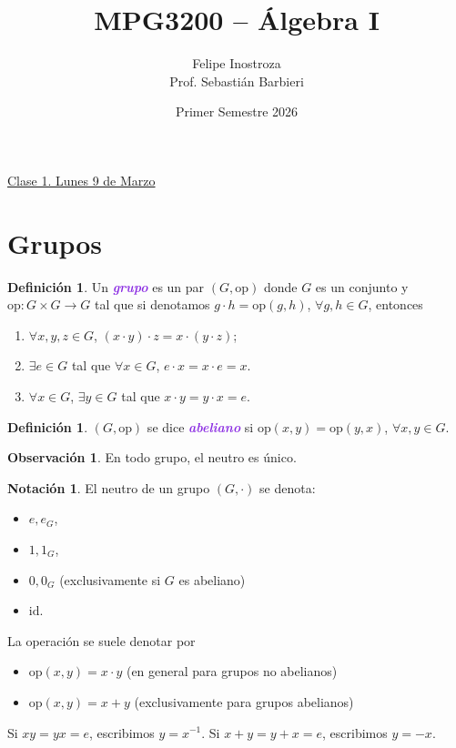 \documentclass{article}
\title{MPG3200 -- Álgebra I}
\author{Felipe Inostroza \\ Prof. Sebastián Barbieri}
\date{Primer Semestre 2026}
\theoremstyle{definition}
\newtheorem{definition}[theorem]{Definición}
\newtheorem*{notation}{Notación}
\newtheorem*{obs}{Observación}
\theoremstyle{remark}
\numberwithin{equation}{section}
\newcommand{\id}{\mathrm{id}}
\newcommand{\op}{\mathrm{op}}
\newcommand{\wea}[1]{\textcolor{BlueViolet}{\textbf{\emph{#1}}}}
\newcommand{\fecha}[1]{\begin{flushright} \underline{#1} \end{flushright}}
\begin{document}
\maketitle
\tableofcontents

\newpage
\fecha{Clase 1. Lunes 9 de Marzo}
\section{Grupos}

\begin{definition}
  Un \wea{grupo} es un par $(G,\mathrm{op})$ donde $G$ es un conjunto y $\mathrm{op} \colon G \times G \to G$ tal que si denotamos $g\cdot h = \mathrm{op}(g,h)$, $\forall g,h \in G$, entonces
  \begin{enumerate}[(1)]
    \item $\forall x,y,z \in G$, $(x \cdot y) \cdot z = x \cdot (y \cdot z)$;
    \item $\exists e \in G$ tal que $\forall x \in G$, $e \cdot x = x \cdot e = x$.
    \item $\forall x \in G$, $\exists y \in G$ tal que $x \cdot y = y \cdot x = e$.
  \end{enumerate}
\end{definition}

\begin{definition}
  $(G,\op)$ se dice \wea{abeliano} si $\op(x,y) = \op(y,x)$, $\forall x,y \in G$.
\end{definition}

\begin{obs}
  En todo grupo, el neutro es único.
\end{obs}

\begin{notation}
  El neutro de un grupo $(G,\cdot)$ se denota:
  \begin{itemize}
    \item $e, e_G$,
    \item $1, 1_G$,
    \item $0, 0_G$ (exclusivamente si $G$ es abeliano)
    \item $\id$.
  \end{itemize}
  La operación se suele denotar por
  \begin{itemize}
    \item $\op(x,y) = x \cdot y$ (en general para grupos no abelianos)
    \item $\op(x,y) = x+y$ (exclusivamente para grupos abelianos)
  \end{itemize}
  Si $xy = yx = e$, escribimos $y = x^{-1}$.
  Si $x+y=y+x=e$, escribimos $y = -x$.
\end{notation}
\end{document}
